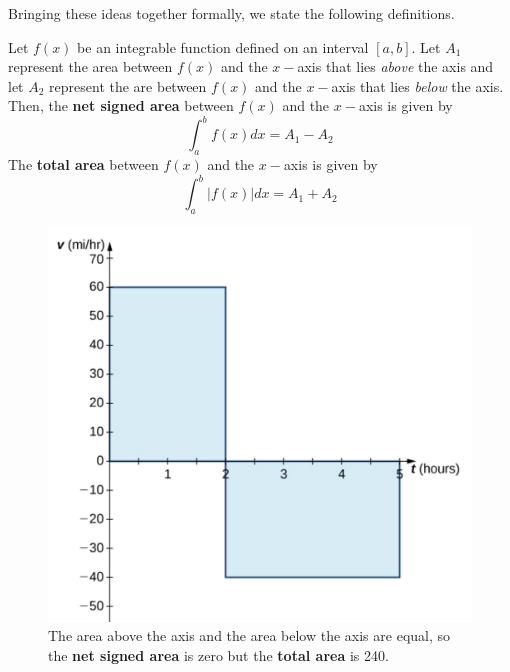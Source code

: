 \noindent Bringing these ideas together formally, we state the following definitions.
\begin{tcolorbox}[title = {Net Signed Area vs. Total Area}]
Let $f(x)$ be an integrable function defined on an interval $[a,b]$. Let $A_1$ represent the area between $f(x)$ and the $x-$axis that lies \emph{above} the axis and let $A_2$ represent the are between $f(x)$ and the $x-$axis that lies \emph{below} the axis. Then, the \textbf{net signed area} between $f(x)$ and the $x-$axis is given by
\begin{equation*}
    \int_a^b f(x) dx=A_1-A_2
\end{equation*}
The \textbf{total area} between $f(x)$ and the $x-$axis is given by
\begin{equation*}
    \int_a^b \bm{|}f(x)\bm{|} dx=A_1+A_2
\end{equation*}
\end{tcolorbox}
\newpage
\begin{figure}[h!]
    \centering
    \includegraphics[scale=0.4 ]{images/defIntgArea/carVelocity.png}
    \caption{The area above the axis and the area below the axis are equal, so the \textbf{net signed area} is zero but the \textbf{total area} is 240.}
    \label{fig:netAreaCar}
\end{figure}

